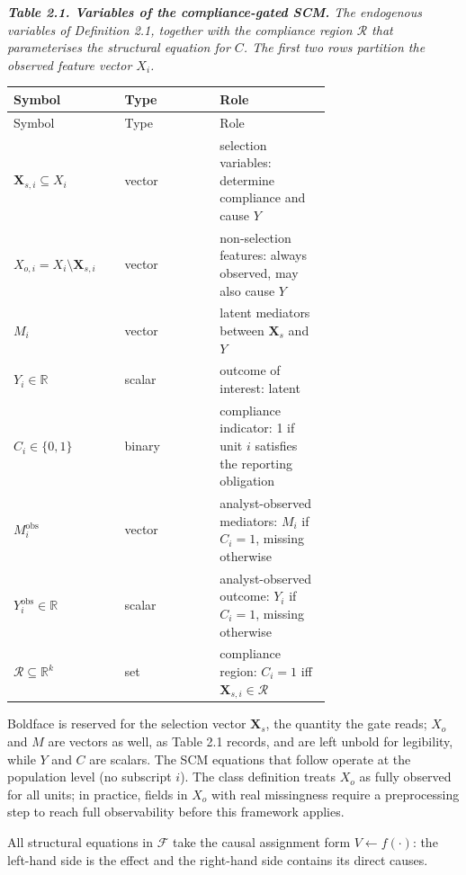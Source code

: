 \par\medskip\noindent
{\small\itshape \textbf{Table 2.1. Variables of the compliance-gated SCM.} The endogenous variables of Definition 2.1, together with the compliance region $\mathcal{R}$ that parameterises the structural equation for $C$. The first two rows partition the observed feature vector $X_i$.\par}
\nopagebreak\medskip\nopagebreak
{
\setlength{\tabcolsep}{7pt}
\renewcommand{\arraystretch}{1.15}
\begin{longtable}{p{0.35\linewidth}lp{0.35\linewidth}}
\toprule
Symbol & Type & Role \\
\midrule
\endfirsthead
\toprule
Symbol & Type & Role \\
\midrule
\endhead
\bottomrule
\endlastfoot
$\mathbf{X}_{s,i} \subseteq X_i$ & vector & selection variables: determine compliance and cause $Y$ \\
$X_{o,i} = X_i \setminus \mathbf{X}_{s,i}$ & vector & non-selection features: always observed, may also cause $Y$ \\
$M_i$ & vector & latent mediators between $\mathbf{X}_s$ and $Y$ \\
$Y_i \in \mathbb{R}$ & scalar & outcome of interest: latent \\
$C_i \in \{0, 1\}$ & binary & compliance indicator: 1 if unit $i$ satisfies the reporting obligation \\
$M_i^{\text{obs}}$ & vector & analyst-observed mediators: $M_i$ if $C_i = 1$, missing otherwise \\
$Y_i^{\text{obs}} \in \mathbb{R}$ & scalar & analyst-observed outcome: $Y_i$ if $C_i = 1$, missing otherwise \\
$\mathcal{R} \subseteq \mathbb{R}^k$ & set & compliance region: $C_i = 1$ iff $\mathbf{X}_{s,i} \in \mathcal{R}$ \\
\end{longtable}
}
\par\medskip

Boldface is reserved for the selection vector $\mathbf{X}_s$, the quantity the gate reads; $X_o$ and $M$ are vectors as well, as Table 2.1 records, and are left unbold for legibility, while $Y$ and $C$ are scalars. The SCM equations that follow operate at the population level (no subscript $i$). The class definition treats $X_o$ as fully observed for all units; in practice, fields in $X_o$ with real missingness require a preprocessing step to reach full observability before this framework applies.

All structural equations in $\mathcal{F}$ take the causal assignment form $V \leftarrow f(\cdot)$: the left-hand side is the effect and the right-hand side contains its direct causes.

